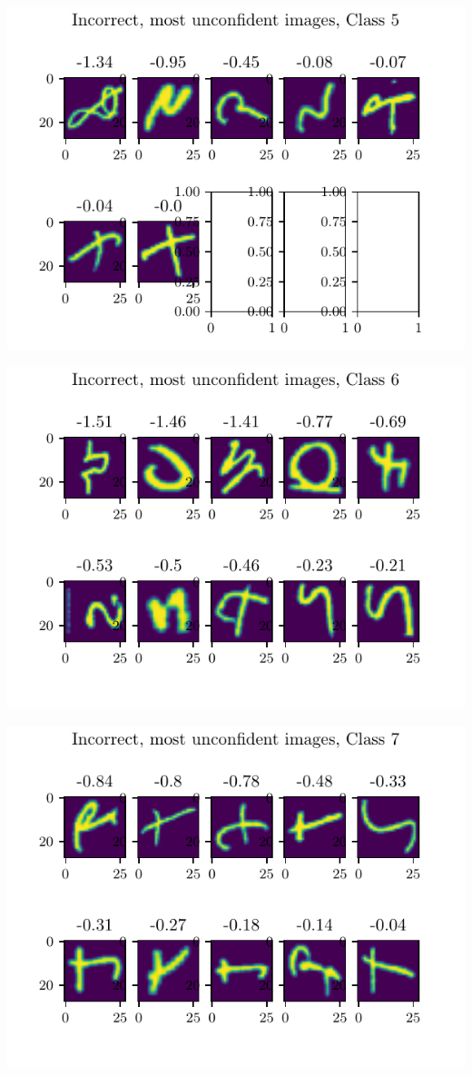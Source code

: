 \documentclass[11pt]{article}
\begin{document}
\includegraphics{figures/2d_unconfident_imgs_class_5.pdf}

\includegraphics{figures/2d_unconfident_imgs_class_6.pdf}

\includegraphics{figures/2d_unconfident_imgs_class_7.pdf}
\end{document}
